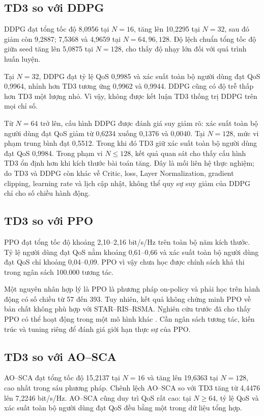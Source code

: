 \subsection{TD3 so với DDPG}
DDPG đạt tổng tốc độ 8,0956 tại $N=16$, tăng lên 10,2295 tại $N=32$, sau đó giảm còn 9,2887; 7,5368 và 4,9659 tại $N=64,96,128$. Độ lệch chuẩn tổng tốc độ giữa seed tăng lên 5,0875 tại $N=128$, cho thấy độ nhạy lớn đối với quá trình huấn luyện.

Tại $N=32$, DDPG đạt tỷ lệ QoS 0,9985 và xác suất toàn bộ người dùng đạt QoS 0,9964, nhỉnh hơn TD3 tương ứng 0,9962 và 0,9944. DDPG cũng có độ trễ thấp hơn TD3 một lượng nhỏ. Vì vậy, không được kết luận TD3 thống trị DDPG trên mọi chỉ số.

Từ $N=64$ trở lên, cấu hình DDPG được đánh giá suy giảm rõ: xác suất toàn bộ người dùng đạt QoS giảm từ 0,6234 xuống 0,1376 và 0,0040. Tại $N=128$, mức vi phạm trung bình đạt 0,5512. Trong khi đó TD3 giữ xác suất toàn bộ người dùng đạt QoS 0,9984. Trong phạm vi $N\le128$, kết quả quan sát cho thấy cấu hình TD3 ổn định hơn khi kích thước bài toán tăng. Đây là mối liên hệ thực nghiệm; do TD3 và DDPG còn khác về Critic, loss, Layer Normalization, gradient clipping, learning rate và lịch cập nhật, không thể quy sự suy giảm của DDPG chỉ cho số chiều hành động.

\subsection{TD3 so với PPO}
PPO đạt tổng tốc độ khoảng 2,10--2,16 bit/s/Hz trên toàn bộ năm kích thước. Tỷ lệ người dùng đạt QoS nằm khoảng 0,61--0,66 và xác suất toàn bộ người dùng đạt QoS chỉ khoảng 0,04--0,09. PPO vì vậy chưa học được chính sách khả thi trong ngân sách 100.000 tương tác.

Một nguyên nhân hợp lý là PPO là phương pháp on-policy và phải học trên hành động có số chiều từ 57 đến 393. Tuy nhiên, kết quả không chứng minh PPO về bản chất không phù hợp với STAR--RIS--RSMA. Nghiên cứu trước đã cho thấy PPO có thể hoạt động trong một mô hình khác \cite{Meng2024PPOSTARRSMA}. Cần ngân sách tương tác, kiến trúc và tuning riêng để đánh giá giới hạn thực sự của PPO.

\subsection{TD3 so với AO--SCA}
AO--SCA đạt tổng tốc độ 15,2137 tại $N=16$ và tăng lên 19,6363 tại $N=128$, cao nhất trong sáu phương pháp. Chênh lệch AO--SCA so với TD3 tăng từ 4,4476 lên 7,2246 bit/s/Hz. AO--SCA cũng duy trì QoS rất cao: tại $N\ge64$, tỷ lệ QoS và xác suất toàn bộ người dùng đạt QoS đều bằng một trong dữ liệu tổng hợp.

